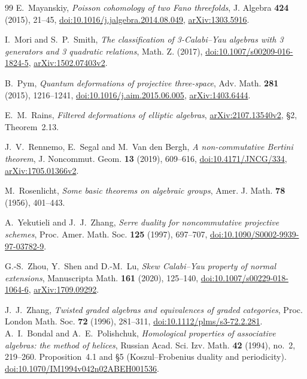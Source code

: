 \documentclass[11pt,a4paper]{ltjsarticle}
\numberwithin{equation}{section}
\begin{document}
\begin{thebibliography}{99}
E.~Mayanskiy,
\textit{Poisson cohomology of two Fano threefolds},
J. Algebra \textbf{424} (2015), 21--45,
\href{https://doi.org/10.1016/j.jalgebra.2014.08.049}{doi:10.1016/j.jalgebra.2014.08.049},
\href{https://arxiv.org/abs/1303.5916}{arXiv:1303.5916}.

I.~Mori and S.~P.~Smith,
\textit{The classification of 3-Calabi--Yau algebras with 3 generators and 3 quadratic relations},
Math. Z. (2017),
\href{https://doi.org/10.1007/s00209-016-1824-5}{doi:10.1007/s00209-016-1824-5},
\href{https://arxiv.org/abs/1502.07403}{arXiv:1502.07403v2}.

B.~Pym,
\textit{Quantum deformations of projective three-space},
Adv. Math. \textbf{281} (2015), 1216--1241,
\href{https://doi.org/10.1016/j.aim.2015.06.005}{doi:10.1016/j.aim.2015.06.005},
\href{https://arxiv.org/abs/1403.6444}{arXiv:1403.6444}.

E.~M.~Rains,
\textit{Filtered deformations of elliptic algebras},
\href{https://arxiv.org/abs/2107.13540}{arXiv:2107.13540v2},
\S2, Theorem~2.13.

J.~V.~Rennemo, E.~Segal and M.~Van den Bergh,
\textit{A non-commutative Bertini theorem},
J. Noncommut. Geom. \textbf{13} (2019), 609--616,
\href{https://doi.org/10.4171/JNCG/334}{doi:10.4171/JNCG/334},
\href{https://arxiv.org/abs/1705.01366}{arXiv:1705.01366v2}.

M.~Rosenlicht,
\textit{Some basic theorems on algebraic groups},
Amer. J. Math. \textbf{78} (1956), 401--443.

A.~Yekutieli and J.~J.~Zhang,
\textit{Serre duality for noncommutative projective schemes},
Proc. Amer. Math. Soc. \textbf{125} (1997), 697--707,
\href{https://doi.org/10.1090/S0002-9939-97-03782-9}{doi:10.1090/S0002-9939-97-03782-9}.

G.-S.~Zhou, Y.~Shen and D.-M.~Lu,
\textit{Skew Calabi--Yau property of normal extensions},
Manuscripta Math. \textbf{161} (2020), 125--140,
\href{https://doi.org/10.1007/s00229-018-1064-6}{doi:10.1007/s00229-018-1064-6},
\href{https://arxiv.org/abs/1709.09292}{arXiv:1709.09292}.

J.~J.~Zhang,
\textit{Twisted graded algebras and equivalences of graded categories},
Proc. London Math. Soc. \textbf{72} (1996), 281--311,
\href{https://doi.org/10.1112/plms/s3-72.2.281}{doi:10.1112/plms/s3-72.2.281}.
A.~I.~Bondal and A.~E.~Polishchuk,
\emph{Homological properties of associative algebras: the method of helices},
Russian Acad. Sci. Izv. Math. \textbf{42} (1994), no.~2, 219--260.
Proposition~4.1 and \S5 (Koszul--Frobenius duality and periodicity).
\href{https://doi.org/10.1070/IM1994v042n02ABEH001536}
{doi:10.1070/IM1994v042n02ABEH001536}.


\end{thebibliography}
\end{document}
